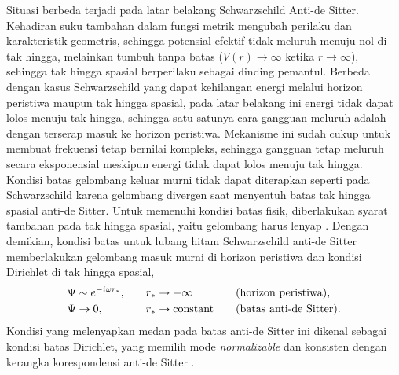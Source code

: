 Situasi berbeda terjadi pada latar belakang Schwarzschild Anti-de Sitter. Kehadiran suku
tambahan dalam fungsi metrik mengubah perilaku dan karakteristik geometris, sehingga
potensial efektif tidak meluruh menuju nol di tak hingga, melainkan tumbuh tanpa batas
($V(r) \to \infty$ ketika $r \to \infty$), sehingga tak hingga spasial berperilaku sebagai
dinding pemantul. Berbeda dengan kasus Schwarzschild yang dapat kehilangan energi melalui horizon peristiwa
maupun tak hingga spasial, pada latar belakang ini energi tidak dapat lolos menuju tak
hingga, sehingga satu-satunya cara gangguan meluruh adalah dengan terserap masuk ke horizon
peristiwa. Mekanisme ini sudah cukup untuk membuat frekuensi tetap bernilai kompleks,
sehingga gangguan tetap meluruh secara eksponensial meskipun energi tidak dapat lolos menuju
tak hingga. Kondisi batas gelombang keluar murni tidak dapat diterapkan seperti pada
Schwarzschild karena gelombang divergen saat menyentuh batas tak hingga spasial anti-de
Sitter. Untuk memenuhi kondisi batas fisik, diberlakukan syarat tambahan pada tak hingga
spasial, yaitu gelombang harus lenyap \parencite{Horowitz2000}. Dengan demikian, kondisi
batas untuk lubang hitam Schwarzschild anti-de Sitter memberlakukan gelombang masuk murni
di horizon peristiwa dan kondisi Dirichlet di tak hingga spasial,
\begin{alignat}{3}
    \Psi &\sim e^{-i\omega r_*}, &\quad &r_* \to -\infty \quad &&(\text{horizon peristiwa}), \notag \\
    \Psi &\to 0, &\quad &r_* \to \text{constant} \quad &&(\text{batas anti-de Sitter}).
    \label{eq:bc-sads}
\end{alignat}
Kondisi yang melenyapkan medan pada batas anti-de Sitter ini dikenal sebagai kondisi batas
Dirichlet, yang memilih mode \textit{normalizable} dan konsisten dengan kerangka
korespondensi anti-de Sitter \parencite{MossNorman2002}.